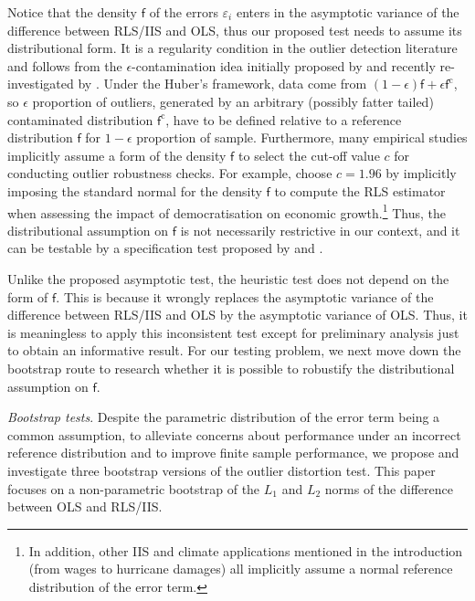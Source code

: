 \documentclass[11pt, letterpaper]{article}
\numberwithin{algorithm}{section}
\numberwithin{assumption}{section}
\numberwithin{lemma}{section}
\numberwithin{theorem}{section}
\numberwithin{corollary}{section}
\numberwithin{remark}{section}
\numberwithin{equation}{section}
\numberwithin{figure}{section}
\numberwithin{table}{section}
\begin{document}
Notice that the density $\mathsf{f}$ of the errors $\varepsilon_{i}$ enters in the asymptotic variance of the difference between RLS/IIS and OLS, thus our proposed test needs to assume its distributional form. It is a regularity condition in the outlier detection literature and follows from the $\epsilon$-contamination idea initially proposed by \cite{huber1964robust} and recently re-investigated by \cite{johansen2016analysis}. Under the Huber's framework, data come from $(1 - \epsilon) \mathsf{f} + \epsilon \mathsf{f}^{\mathrm{c}}$, so $\epsilon$ proportion of outliers, generated by an arbitrary (possibly fatter tailed) contaminated distribution $\mathsf{f}^{\mathrm{c}}$, have to be defined relative to a reference distribution $\mathsf{f}$ for $1 - \epsilon$ proportion of sample. Furthermore, many empirical studies implicitly assume a form of the density $\mathsf{f}$ to select the cut-off value $c$ for conducting outlier robustness checks. For example, \cite{acemoglu2019democracy} choose $c = 1.96$ by implicitly imposing the standard normal for the density $\mathsf{f}$ to compute the RLS estimator when assessing the impact of democratisation on economic growth.\footnote{In addition, other IIS and climate applications mentioned in the introduction (from wages to hurricane damages) all implicitly assume a normal reference distribution of the error term.} Thus, the distributional assumption on $\mathsf{f}$ is not necessarily restrictive in our context, and it can be testable by a specification test proposed by \cite{berenguer2018marked} and \cite{jiao2020testingoutlier}.

Unlike the proposed asymptotic test, the heuristic test does not depend on the form of $\mathsf{f}$. This is because it wrongly replaces the asymptotic variance of the difference between RLS/IIS and OLS by the asymptotic variance of OLS. Thus, it is meaningless to apply this inconsistent test except for preliminary analysis just to obtain an informative result. For our testing problem, we next move down the bootstrap route to research whether it is possible to robustify the distributional assumption on $\mathsf{f}$.

\emph{Bootstrap tests}. Despite the parametric distribution of the error term being a common assumption, to alleviate concerns about performance under an incorrect reference distribution and to improve finite sample performance, we propose and investigate three bootstrap versions of the outlier distortion test. This paper focuses on a non-parametric bootstrap of the $L_{1}$ and $L_{2}$ norms of the difference between OLS and RLS/IIS.
\end{document}
